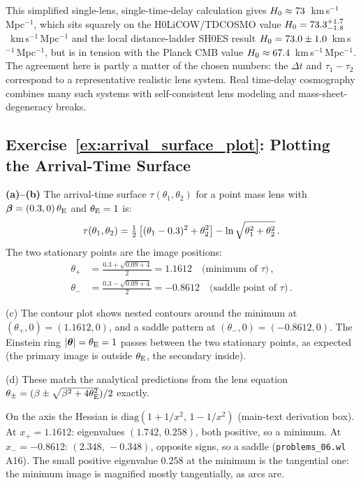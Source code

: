 \begin{remark}
This simplified single-lens, single-time-delay calculation gives
$H_0 \approx 73$~km\,s$^{-1}$\,Mpc$^{-1}$, which sits squarely on
the H0LiCOW/TDCOSMO value
$H_0 = 73.3^{+1.7}_{-1.8}$~km\,s$^{-1}$\,Mpc$^{-1}$ and the local
distance-ladder SH0ES result
$H_0 = 73.0 \pm 1.0$~km\,s$^{-1}$\,Mpc$^{-1}$, but is in tension with
the Planck CMB value $H_0 \approx 67.4$~km\,s$^{-1}$\,Mpc$^{-1}$.
The agreement here is partly a matter of the chosen numbers: the
$\Delta t$ and $\tau_1 - \tau_2$ correspond to a representative
realistic lens system.  Real time-delay cosmography combines many such
systems with self-consistent lens modeling and mass-sheet-degeneracy
breaks.
\end{remark}

\subsection*{Exercise~\ref{ex:arrival_surface_plot}: Plotting the Arrival-Time Surface}

\textbf{(a)--(b)} The arrival-time surface
$\tau(\theta_1, \theta_2)$ for a point mass lens with
$\boldsymbol{\beta} = (0.3, 0)\,\theta_{\mathrm{E}}$ and $\theta_{\mathrm{E}} = 1$ is:
\begin{equation*}
    \tau(\theta_1, \theta_2) = \tfrac{1}{2}\left[(\theta_1 - 0.3)^2 + \theta_2^2\right]
    - \ln\sqrt{\theta_1^2 + \theta_2^2} \,.
\end{equation*}
The two stationary points are the image positions:
\begin{align*}
    \theta_+ &= \frac{0.3 + \sqrt{0.09 + 4}}{2} = 1.1612 \quad
    \text{(minimum of $\tau$)} \,, \\
    \theta_- &= \frac{0.3 - \sqrt{0.09 + 4}}{2} = -0.8612 \quad
    \text{(saddle point of $\tau$)} \,.
\end{align*}

(c) The contour plot shows nested contours around the minimum
at $(\theta_+, 0) = (1.1612, 0)$, and a saddle pattern at
$(\theta_-, 0) = (-0.8612, 0)$.  The Einstein ring
$|\boldsymbol{\theta}| = \theta_{\mathrm{E}} = 1$ passes between the two stationary points,
as expected (the primary image is outside $\theta_{\mathrm{E}}$, the secondary
inside).

(d) These match the analytical predictions from the lens
equation $\theta_\pm = (\beta \pm \sqrt{\beta^2 + 4\theta_{\mathrm{E}}^2})/2$
exactly.  \checkmark

\begin{annotation}
On the axis the Hessian is $\mathrm{diag}(1+1/x^2,\,1-1/x^2)$ (main-text
derivation box).  At $x_+ = 1.1612$: eigenvalues $(1.742,\,0.258)$, both
positive, so a minimum.  At $x_- = -0.8612$: $(2.348,\,-0.348)$, opposite
signs, so a saddle (\texttt{problems\_06.wl} A16).  The small positive
eigenvalue $0.258$ at the minimum is the tangential one: the minimum image
is magnified mostly tangentially, as arcs are.
\end{annotation}

